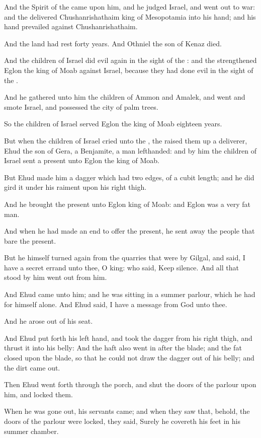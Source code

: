 \verse And the Spirit of the \LORD came upon him, and he judged Israel, and went out to war: and the \LORD delivered Chushanrishathaim king of Mesopotamia into his hand; and his hand prevailed against Chushanrishathaim.

\verse And the land had rest forty years. And Othniel the son of Kenaz died.

\verse And the children of Israel did evil again in the sight of the \LORD: and the \LORD strengthened Eglon the king of Moab against Israel, because they had done evil in the sight of the \LORD.

\verse And he gathered unto him the children of Ammon and Amalek, and went and smote Israel, and possessed the city of palm trees.

\verse So the children of Israel served Eglon the king of Moab eighteen years.

\verse But when the children of Israel cried unto the \LORD, the \LORD raised them up a deliverer, Ehud the son of Gera, a Benjamite, a man lefthanded: and by him the children of Israel sent a present unto Eglon the king of Moab.

\verse But Ehud made him a dagger which had two edges, of a cubit length; and he did gird it under his raiment upon his right thigh.

\verse And he brought the present unto Eglon king of Moab: and Eglon was a very fat man.

\verse And when he had made an end to offer the present, he sent away the people that bare the present.

\verse But he himself turned again from the quarries that were by Gilgal, and said, I have a secret errand unto thee, O king: who said, Keep silence. And all that stood by him went out from him.

\verse And Ehud came unto him; and he was sitting in a summer parlour, which he had for himself alone. And Ehud said, I have a message from God unto thee.

And he arose out of his seat.

\verse And Ehud put forth his left hand, and took the dagger from his right thigh, and thrust it into his belly: \verse And the haft also went in after the blade; and the fat closed upon the blade, so that he could not draw the dagger out of his belly; and the dirt came out.

\verse Then Ehud went forth through the porch, and shut the doors of the parlour upon him, and locked them.

\verse When he was gone out, his servants came; and when they saw that, behold, the doors of the parlour were locked, they said, Surely he covereth his feet in his summer chamber.

